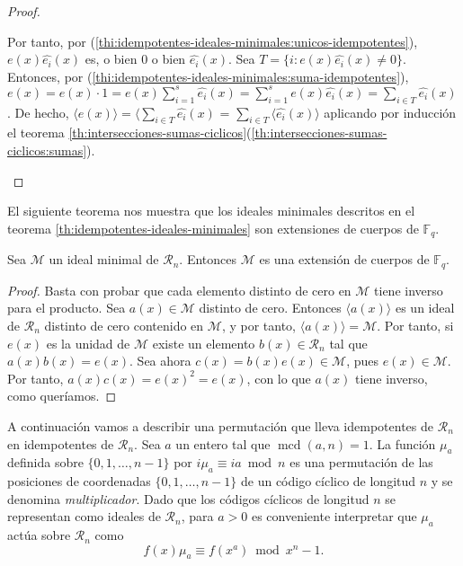 \begin{proof}
\begin{enumerate}
    Por tanto, por (\ref{thi:idempotentes-ideales-minimales:unicos-idempotentes}), \(e(x)\widehat{e_i}(x)\) es, o bien \(0\) o bien \(\widehat{e_i}(x)\).
    Sea \(T = \{i : e(x)\widehat{e_i}(x) \neq 0\}\).
    Entonces, por (\ref{thi:idempotentes-ideales-minimales:suma-idempotentes}), \(e(x) = e(x) \cdot 1 = e(x)\sum_{i=1}^s \widehat{e_i}(x) = \sum_{i=1}^s e(x)\widehat{e_i}(x) = \sum_{i \in T}\widehat{e_i}(x)\).
    De hecho, \(\langle e(x)\rangle = \langle \sum_{i \in T}\widehat{e_i}(x)\) = \(\sum_{i \in T}\langle\widehat{e_i}(x)\rangle\) aplicando por inducción el teorema \ref{th:intersecciones-sumas-ciclicos}(\ref{th:intersecciones-sumas-ciclicos:sumas}).\qedhere
  \end{enumerate}
\end{proof}

El siguiente teorema nos muestra que los ideales minimales descritos en el teorema \ref{th:idempotentes-ideales-minimales} son extensiones de cuerpos de \(\mathbb F_q\).

\begin{theorem}
  Sea \(\mathcal M\) un ideal minimal de \(\mathcal R_n\).
  Entonces \(\mathcal M\) es una extensión de cuerpos de \(\mathbb F_q\).
\end{theorem}

\begin{proof}
  Basta con probar que cada elemento distinto de cero en \(\mathcal M\) tiene inverso para el producto.
  Sea \(a(x) \in \mathcal M\) distinto de cero.
  Entonces \(\langle a(x) \rangle\) es un ideal de \(\mathcal R_n\) distinto de cero contenido en \(\mathcal M\), y por tanto, \(\langle a(x) \rangle = \mathcal M\).
  Por tanto, si \(e(x)\) es la unidad de \(\mathcal M\) existe un elemento \(b(x) \in \mathcal R_n\) tal que \(a(x)b(x) = e(x)\).
  Sea ahora \(c(x) = b(x)e(x) \in \mathcal M\), pues \(e(x) \in \mathcal M\).
  Por tanto, \(a(x)c(x) = e(x)^2 = e(x)\), con lo que \(a(x)\) tiene inverso, como queríamos.
\end{proof}

A continuación vamos a describir una permutación que lleva idempotentes de \(\mathcal R_n\) en idempotentes de \(\mathcal R_n\).
Sea \(a\) un entero tal que \(\operatorname{mcd}(a, n) = 1\).
La función \(\mu_a\) definida sobre \(\{0, 1, \dots, n -1\}\) por \(i\mu_a \equiv ia \bmod n\) es una permutación de las posiciones de coordenadas \(\{0, 1, \dots, n - 1\}\) de un código cíclico de longitud \(n\) y se denomina \textit{multiplicador}.
Dado que los códigos cíclicos de longitud \(n\) se representan como ideales de \(\mathcal R_n\), para \(a > 0\) es conveniente interpretar que \(\mu_a\) actúa sobre \(\mathcal R_n\) como
\begin{equation}
  \label{eq:multiplier-rn}
  f(x)\mu_a \equiv f(x^a) \bmod x^n - 1.
\end{equation}


